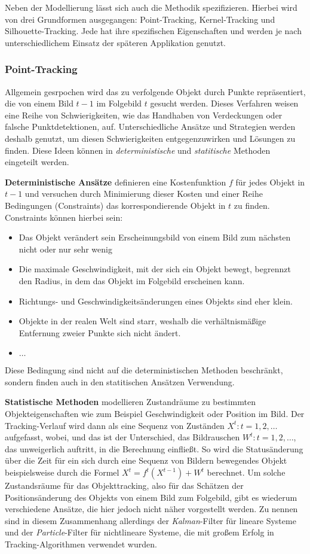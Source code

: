 Neben der Modellierung lässt sich auch die Methodik spezifizieren. Hierbei wird von drei Grundformen ausgegangen: Point-Tracking, Kernel-Tracking und Silhouette-Tracking. Jede hat ihre spezifischen Eigenschaften und werden je nach unterschiedlichem Einsatz der späteren Applikation genutzt.

\subsubsection{Point-Tracking}
Allgemein gesrpochen wird das zu verfolgende Objekt durch Punkte repräsentiert, die von einem Bild $t-1$ im Folgebild $t$ gesucht werden. Dieses Verfahren weisen eine Reihe von Schwierigkeiten, wie das Handhaben von Verdeckungen oder falsche Punktdetektionen, auf. Unterschiedliche Ansätze und Strategien werden deshalb genutzt, um diesen Schwierigkeiten entgegenzuwirken und Lösungen zu finden. Diese Ideen können in \textit{deterministische} und \textit{statitische} Methoden eingeteilt werden.

{\bf Deterministische Ansätze } definieren eine Kostenfunktion $f$ für jedes Objekt in $t-1$ und versuchen durch Minimierung dieser Kosten und einer Reihe Bedingungen (Constraints) das korrespondierende Objekt in $t$ zu finden. Constraints können hierbei sein:

\begin{itemize}
\item Das Objekt verändert sein Erscheinungsbild von einem Bild zum nächsten nicht oder nur sehr wenig \cite{FPIS}
\item Die maximale Geschwindigkeit, mit der sich ein Objekt bewegt, begrennzt den Radius, in dem das Objekt im Folgebild erscheinen kann.
\item Richtungs- und Geschwindigkeitsänderungen eines Objekts sind eher klein.
\item Objekte in der realen Welt sind starr, weshalb die verhältnismäßige Entfernung zweier Punkte sich nicht ändert.
\item $\dots$
\end{itemize}
Diese Bedingung sind nicht auf die deterministischen Methoden beschränkt, sondern finden auch in den statitischen Ansätzen Verwendung.

{\bf Statistische Methoden} modellieren Zustandräume zu bestimmten Objekteigenschaften wie zum Beispiel Geschwindigkeit oder Position im Bild. Der Tracking-Verlauf wird dann als eine Sequenz von Zuständen $X^{t}:t=1,2,\dots$ aufgefasst, wobei, und das ist der Unterschied, das Bildrauschen $W^{t}:t=1,2,\dots$, das unweigerlich auftritt, in die Berechnung einfließt. So wird die Statusänderung über die Zeit für ein sich durch eine Sequenz von Bildern bewegendes Objekt beispielsweise durch die Formel $X^{t}=f^{t}(X^{t-1})+W^{t}$ berechnet. Um solche Zustandsräume für das Objekttracking, also für das Schätzen der Positionsänderung des Objekts von einem Bild zum Folgebild, gibt es wiederum verschiedene Ansätze, die hier jedoch nicht näher vorgestellt werden. Zu nennen sind in diesem Zusammenhang allerdings der \textit{Kalman}-Filter\cite{KAF} für lineare Systeme und der \textit{Particle}-Filter \cite{PAF} für nichtlineare Systeme, die mit großem Erfolg in Tracking-Algorithmen verwendet wurden.

